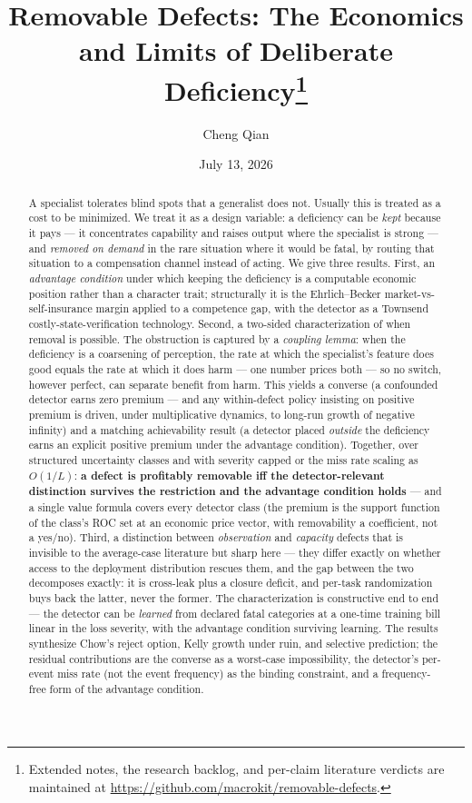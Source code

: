 \documentclass[11pt]{article}
\title{Removable Defects: The Economics and Limits of Deliberate
  Deficiency\thanks{Extended notes, the research backlog, and per-claim
  literature verdicts are maintained at
  \url{https://github.com/macrokit/removable-defects}.}}
\author{Cheng Qian}
\date{July 13, 2026}
\theoremstyle{plain}
\theoremstyle{definition}
\begin{document}
\maketitle

\begin{abstract}
A specialist tolerates blind spots that a generalist does not. Usually this is
treated as a cost to be minimized. We treat it as a design variable: a
deficiency can be \emph{kept} because it pays --- it concentrates capability and
raises output where the specialist is strong --- and \emph{removed on demand} in the
rare situation where it would be fatal, by routing that situation to a
compensation channel instead of acting. We give three results. First, an
\emph{advantage condition} under which keeping the deficiency is a computable
economic position rather than a character trait; structurally it is the
Ehrlich--Becker market-vs-self-insurance margin applied to a competence gap,
with the detector as a Townsend costly-state-verification technology. Second,
a two-sided characterization of when removal is possible. The obstruction is
captured by a \emph{coupling lemma}: when the deficiency is a coarsening of
perception, the rate at which the specialist's feature does good equals the
rate at which it does harm --- one number prices both --- so no switch, however perfect, can separate
benefit from harm. This yields a converse (a confounded detector earns zero
premium --- and any within-defect policy insisting on positive premium is
driven, under multiplicative dynamics, to long-run growth of negative
infinity) and a matching achievability result (a detector placed
\emph{outside} the deficiency earns an explicit positive premium under the
advantage condition). Together, over structured uncertainty classes and with
severity capped or the miss rate scaling as $O(1/L)$: \textbf{a defect is
profitably removable iff the
detector-relevant distinction survives the restriction and the advantage
condition holds} --- and a single value formula covers every detector class
(the premium is the support function of the class's ROC set at an economic
price vector, with removability a coefficient, not a yes/no). Third, a
distinction between \emph{observation} and \emph{capacity} defects that is invisible to
the average-case literature but sharp here --- they differ exactly on whether
access to the deployment distribution rescues them, and the gap between the
two decomposes exactly: it is cross-leak plus a closure deficit, and per-task
randomization buys back the latter, never the former. The characterization is
constructive end to end --- the detector can be \emph{learned} from declared fatal
categories at a one-time training bill linear in the loss severity, with the
advantage condition surviving learning. The results synthesize Chow's reject
option, Kelly growth under ruin, and selective prediction; the residual
contributions are the converse as a worst-case impossibility, the detector's
per-event miss rate (not the event frequency) as the binding constraint, and
a frequency-free form of the advantage condition.
\end{abstract}
\end{document}
